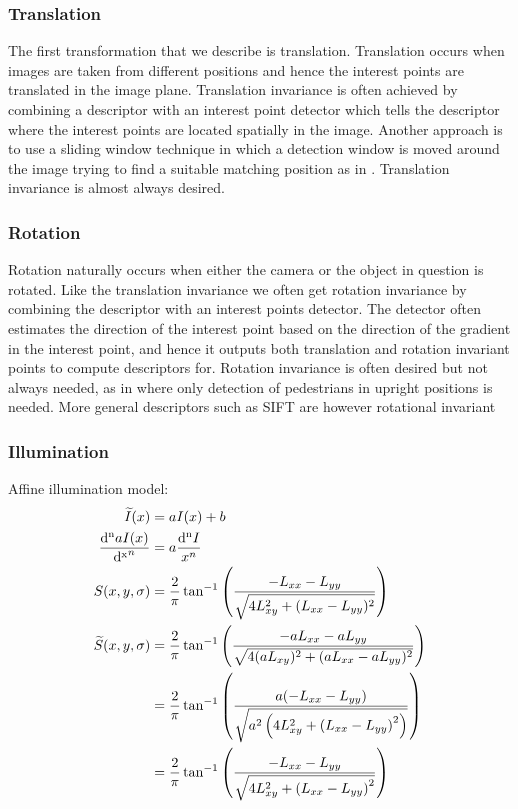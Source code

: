 \documentclass[../thesis.tex]{subfiles}
\begin{document}

\subsubsection{Translation}
The first transformation that we describe is translation. Translation occurs when images are taken from different positions and hence the interest points are translated in the image plane. Translation invariance is often achieved by combining a descriptor with an interest point detector which tells the descriptor where the interest points are located spatially in the image. Another approach is to use a sliding window technique in which a detection window is moved around the image trying to find a suitable matching position as in \cite{felzenszwalb2008discriminatively}. Translation invariance is almost always desired.


\subsubsection{Rotation}
Rotation naturally occurs when either the camera or the object in question is rotated. Like the translation invariance we often get rotation invariance by combining the descriptor with an interest points detector. The detector often estimates the direction of the interest point based on the direction of the gradient in the interest point, and hence it outputs both translation and rotation invariant points to compute descriptors for. Rotation invariance is often desired but not always needed, as in \cite{dalal2005histograms,felzenszwalb2008discriminatively} where only detection of pedestrians in upright positions is needed. More general descriptors such as SIFT are however rotational invariant


\subsubsection{Illumination}
Affine illumination model:
\begin{align}
  \widetilde{I}(x) &= a I(x)  + b \\
  \frac{\mathop{}\!\mathrm{d^n} a I(x)}{\mathop{}\!\mathrm{d^x}^n} &= a \frac{\mathop{}\!\mathrm{d^n}I}{ x^n} \\
  S(x,y,\sigma) &= \frac{2}{\pi} \tan^{-1} \left( \frac{-L_{xx} - L_{yy}}{\sqrt{4L_{xy}^2 + (L_{xx} - L_{yy})^2}} \right) \\
  \widetilde{S}(x,y,\sigma) &= \frac{2}{\pi} \tan^{-1} \left( \frac{-a L_{xx} - a L_{yy}}{\sqrt{4(aL_{xy})^2 + (aL_{xx} - aL_{yy})^2}} \right) \\
  &= \frac{2}{\pi} \tan^{-1} \left( \frac{a (-L_{xx} - L_{yy})}{\sqrt{a^2 \left(4L_{xy}^2 + \left(L_{xx} - L_{yy} \right)^2 \right)}} \right) \\
  &= \frac{2}{\pi} \tan^{-1} \left( \frac{-L_{xx} - L_{yy}}{\sqrt{4L_{xy}^2 + \left(L_{xx} - L_{yy} \right)^2}} \right) \\
\end{align}
\end{document}
